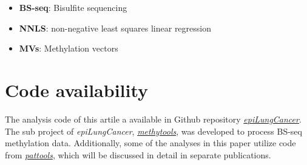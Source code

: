 \documentclass[12pt,letterpaper]{article}
\begin{document}
\begin{itemize}
    \item  \textbf{BS-seq}: Bisulfite sequencing
    \item  \textbf{NNLS}: non-negative least squares linear regression
    \item  \textbf{MVs}: Methylation vectors
\end{itemize}

\section{Code availability}\label{sec:code}

The analysis code of this artile a available in Github repository
\href{https://github.com/hcyvan/epiLungCancer}{\textit{epiLungCancer}}. The sub project of \textit{epiLungCancer},
\href{https://github.com/hcyvan/epiLungCancer/tree/main/methytools}{\textit{methytools}},  was developed
to process BS-seq methylation data. Additionally, some of the analyses in this paper utilize code
from \href{https://github.com/hcyvan/pattools}{\textit{pattools}}, which will be discussed in detail in
separate publications.




\end{document}

